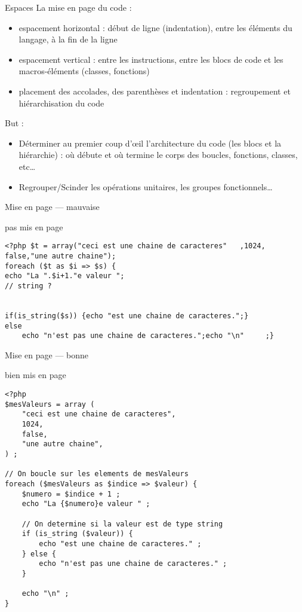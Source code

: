 \begin{frame}[containsverbatim]{Espaces}
	La mise en page du code : 
	\begin{itemize}
		\item espacement horizontal : début de ligne (indentation), entre les éléments du langage, à la fin de la ligne
		\item espacement vertical : entre les instructions, entre les blocs de code et les macros-éléments (classes, fonctions)
		\item placement des accolades, des parenthèses et indentation : regroupement et hiérarchisation du code
	\end{itemize}
	But : 
	\begin{itemize}
		\item Déterminer au premier coup d’œil l’architecture du code (les blocs et la hiérarchie) : où débute et où termine le corps des boucles, fonctions, classes, etc…
		\item Regrouper/Scinder les opérations unitaires, les groupes fonctionnels…
	\end{itemize}
\end{frame}

\begin{frame}[containsverbatim]{Mise en page — mauvaise}
	\begin{block}{pas mis en page}
		\begin{lstlisting}
<?php $t = array("ceci est une chaine de caracteres"   ,1024,
false,"une autre chaine");
foreach ($t as $i => $s) {
echo "La ".$i+1."e valeur ";
// string ?


if(is_string($s)) {echo "est une chaine de caracteres.";} 
else
	echo "n'est pas une chaine de caracteres.";echo "\n"     ;}
		\end{lstlisting}
	\end{block}
\end{frame}

\begin{frame}[containsverbatim]{Mise en page — bonne}
	\begin{block}{bien mis en page}
		\begin{lstlisting}
<?php
$mesValeurs = array (
	"ceci est une chaine de caracteres", 
	1024,
	false,
	"une autre chaine",
) ;

// On boucle sur les elements de mesValeurs
foreach ($mesValeurs as $indice => $valeur) {
	$numero = $indice + 1 ;
	echo "La {$numero}e valeur " ;

	// On determine si la valeur est de type string
	if (is_string ($valeur)) {
		echo "est une chaine de caracteres." ;
	} else {
		echo "n'est pas une chaine de caracteres." ;
	}
	
	echo "\n" ;
}
		\end{lstlisting}
	\end{block}
\end{frame}

